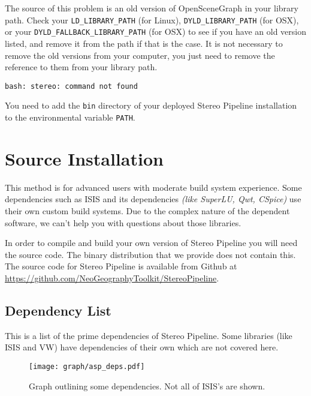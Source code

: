 The source of this problem is an old version of OpenSceneGraph in
your library path. Check your \verb#LD_LIBRARY_PATH# (for Linux),
\verb#DYLD_LIBRARY_PATH# (for OSX), or your \verb#DYLD_FALLBACK_LIBRARY_PATH#
(for OSX) to see if you have an old version listed, and remove it
from the path if that is the case. It is not necessary to remove the
old versions from your computer, you just need to remove the reference
to them from your library path.

\begin{verbatim}
bash: stereo: command not found
\end{verbatim}

You need to add the \texttt{bin} directory of your deployed Stereo
Pipeline installation to the environmental variable \texttt{PATH}.

\newpage

\section{\label{sec:Source-Installation}Source Installation}

This method is for advanced users with moderate build system
experience. Some dependencies such as ISIS and its dependencies
\emph{(like SuperLU, Qwt, CSpice)} use their own custom build systems.
Due to the complex nature of the dependent software, we can't help you
with questions about those libraries.

In order to compile and build your own version of Stereo Pipeline you
will need the source code. The binary distribution that we provide
does not contain this. The source code for Stereo Pipeline is
available from Github at
\url{https://github.com/NeoGeographyToolkit/StereoPipeline}.

\subsection{Dependency List}

This is a list of the prime dependencies of Stereo Pipeline. Some
libraries (like \ac{ISIS} and \ac{VW}) have dependencies of their own
which are not covered here.

\begin{figure}[h]
  \centering
  \texttt{[image: graph/asp\_deps.pdf]}
  \caption{Graph outlining some dependencies. Not all of ISIS's are shown.}
\end{figure}

